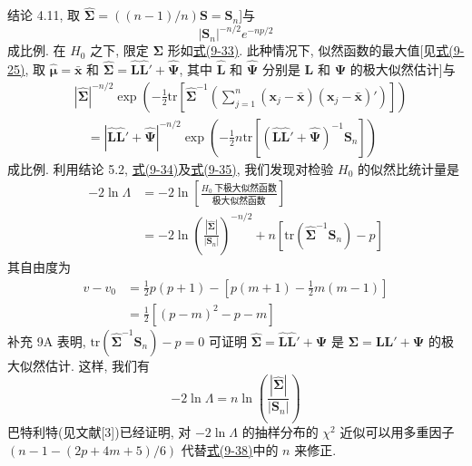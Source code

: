 
结论 4.11, 取 $\hat{\boldsymbol{\Sigma}}=((n-1)/n)\mathbf{S}=\mathbf{S}_n$]与
\label{eq:9-34}
\begin{equation}
|\mathbf{S}_n|^{-n/2}e^{-np/2} \tag{9-34}
\end{equation}
成比例. 在 $H_0$ 之下, 限定 $\boldsymbol{\Sigma}$ 形如\hyperref[eq:9-33]{式(9-33)}. 此种情况下, 似然函数的最大值[见\hyperref[eq:9-25]{式(9-25)}, 取 $\hat{\boldsymbol{\mu}}=\bar{\mathbf{x}}$ 和 $\hat{\boldsymbol{\Sigma}}=\hat{\mathbf{L}}\hat{\mathbf{L}}'+\hat{\boldsymbol{\Psi}}$, 其中 $\hat{\mathbf{L}}$ 和 $\hat{\boldsymbol{\Psi}}$ 分别是 $\mathbf{L}$ 和 $\boldsymbol{\Psi}$ 的极大似然估计]与
\label{eq:9-35}
\begin{equation}
\begin{aligned}
&|\hat{\boldsymbol{\Sigma}}|^{-n/2}\exp\left(-\frac{1}{2}\mathrm{tr}\left[\hat{\boldsymbol{\Sigma}}^{-1}\left(\sum_{j=1}^{n}(\mathbf{x}_j-\bar{\mathbf{x}})(\mathbf{x}_j-\bar{\mathbf{x}})'\right)\right]\right)\\
&\quad=|\hat{\mathbf{L}}\hat{\mathbf{L}}'+\hat{\boldsymbol{\Psi}}|^{-n/2}\exp\left(-\frac{1}{2}n\mathrm{tr}[(\hat{\mathbf{L}}\hat{\mathbf{L}}'+\hat{\boldsymbol{\Psi}})^{-1}\mathbf{S}_n]\right)
\end{aligned}
\tag{9-35}
\end{equation}
成比例. 利用结论 5.2, \hyperref[eq:9-34]{式(9-34)}及\hyperref[eq:9-35]{式(9-35)}, 我们发现对检验 $H_0$ 的似然比统计量是
\label{eq:9-36}
\begin{equation}
\begin{aligned}
-2\ln\Lambda&=-2\ln\left[\frac{H_0\ \text{下极大似然函数}}{\text{极大似然函数}}\right]\\
&=-2\ln\left(\frac{|\hat{\boldsymbol{\Sigma}}|}{|\mathbf{S}_n|}\right)^{-n/2}+n[\mathrm{tr}(\hat{\boldsymbol{\Sigma}}^{-1}\mathbf{S}_n)-p]
\end{aligned}
\tag{9-36}
\end{equation}
其自由度为
\label{eq:9-37}
\begin{equation}
\begin{aligned}
v-v_0&=\frac{1}{2}p(p+1)-\left[p(m+1)-\frac{1}{2}m(m-1)\right]\\
&=\frac{1}{2}\left[(p-m)^2-p-m\right]
\end{aligned}
\tag{9-37}
\end{equation}
补充 9A 表明, $\mathrm{tr}(\hat{\boldsymbol{\Sigma}}^{-1}\mathbf{S}_n)-p=0$ 可证明 $\hat{\boldsymbol{\Sigma}}=\hat{\mathbf{L}}\hat{\mathbf{L}}'+\hat{\boldsymbol{\Psi}}$ 是 $\boldsymbol{\Sigma}=\mathbf{L}\mathbf{L}'+\boldsymbol{\Psi}$ 的极大似然估计. 这样, 我们有
\label{eq:9-38}
\begin{equation}
-2\ln\Lambda=n\ln\left(\frac{|\hat{\boldsymbol{\Sigma}}|}{|\mathbf{S}_n|}\right) \tag{9-38}
\end{equation}
巴特利特(见文献[3])已经证明, 对 $-2\ln\Lambda$ 的抽样分布的 $\chi^2$ 近似可以用多重因子 $(n-1-(2p+4m+5)/6)$ 代替\hyperref[eq:9-38]{式(9-38)}中的 $n$ 来修正.

